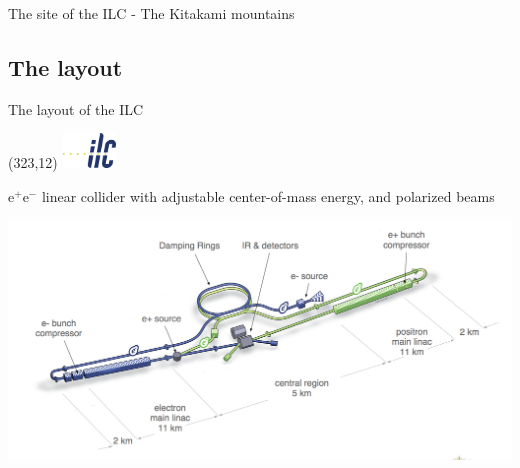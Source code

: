 \documentclass[xcolor={dvipsnames}]{beamer}
\newcommand{\ilclogo}{
  \setlength{\TPHorizModule}{1pt}
  \setlength{\TPVertModule}{1pt}
  \begin{textblock}{1}(323,12)
   \includegraphics[width=40pt,height=26pt]{figures/ILC.jpeg}
  \end{textblock}
}
\begin{document}
\begin{frame}{The site of the ILC - The Kitakami mountains}
\begin{center}
{
}
	\fi
\end{center}
\end{frame}

\subsection{The layout}
\begin{frame}{The layout of the ILC}
\ilclogo

e$^+$e$^-$ linear collider with adjustable center-of-mass energy, and polarized beams\\
\begin{center}
\includegraphics[width=\textwidth]{figures/ILC_schematic_layout.png}
\end{center}
\begin{flushright}
 \href{https://www.youtube.com/watch?v=ep5496vdEFI}{}
\end{flushright}

\end{frame}
\end{document}
